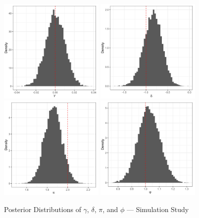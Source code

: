 \begin{figure}[H]
\centering
\includegraphics[width=0.45\textwidth]{../figures/simulation/hist_gamma.png}
\includegraphics[width=0.45\textwidth]{../figures/simulation/hist_delta.png}
\includegraphics[width=0.45\textwidth]{../figures/simulation/hist_pi.png}
\includegraphics[width=0.45\textwidth]{../figures/simulation/hist_phi.png}
\caption{Posterior Distributions of $\gamma$, $\delta$, $\pi$, and $\phi$ --- Simulation Study}
\label{fig:posterior_distributions_2}
\end{figure}

